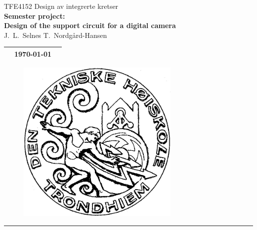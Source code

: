 \documentclass[a4paper, 11pt, norsk]{article}
\begin{document}
\begin{minipage}[c]{0.85\textwidth}
  \huge \centering
  TFE4152 Design av integrerte kretser\\
  \vspace{1ex}
  \huge \textbf{
    Semester project:\\
    Design of the support circuit for a digital camera
  }\\
  \vspace{1ex}
  \Large
  J.~L.~Selnes T.~Nordgård-Hansen
  \vspace{3ex}
  
  \normalsize
  
  \begin{tabular}{p{} p{} p{}}
    \toprule
    & \today\\
    \bottomrule
  \end{tabular}
\end{minipage}

\begin{figure}[H]
  \centering
  \includegraphics[width=0.7\textwidth]{figures/logo.png}
\end{figure}


\newpage
\setlength{\parskip}{0ex}
\renewcommand{\baselinestretch}{0.1}\normalsize
\onehalfspacing
\tableofcontents
\singlespacing
\renewcommand{\baselinestretch}{1.00}\normalsize
\setlength{\parskip}{2ex}
\rule{\textwidth}{1pt}
\end{document}
